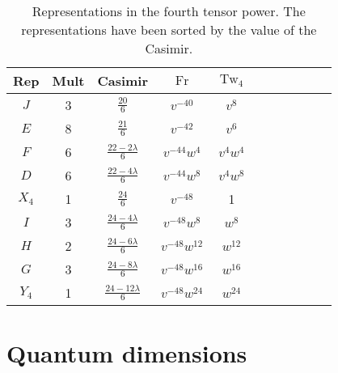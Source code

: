 \documentclass[12pt]{amsart}
\DeclareMathOperator{\Tw}{Tw}
\DeclareMathOperator{\Fr}{Fr}
\begin{document}
\begin{table}
  \centering
  \medskip
  \begin{tabular}{ccccccccccc}
    \toprule
    Rep & Mult & Casimir & $\Fr$ & $\Tw_4$ \\ \midrule
    $J$ & 3 & $\frac{20}{6}$ & $v^{-40}$ & $v^8$ \\[3pt]
    $E$ & 8 & $\frac{21}{6}$ & $v^{-42}$ & $v^6$ \\[3pt]
    $F$ & 6 & $\frac{22 - 2\lambda}{6}$ & $v^{-44}w^4$ & $v^4w^4$ \\[3pt]
    $D$ & 6 & $\frac{22 - 4\lambda}{6}$ & $v^{-44}w^8$ & $v^4w^8$ \\[3pt]
    $X_4$ & 1 & $\frac{24}{6}$ & $v^{-48}$ & 1\\[3pt]
    $I$ & 3 & $\frac{24 - 4\lambda}{6}$ & $v^{-48}w^8$ & $w^8$\\[3pt]
    $H$ & 2 & $\frac{24 - 6\lambda}{6}$ & $v^{-48}w^{12}$ & $w^{12}$\\[3pt]
    $G$ & 3 & $\frac{24 - 8\lambda}{6}$ & $v^{-48}w^{16}$ & $w^{16}$ \\[3pt]
    $Y_4$ & 1 & $\frac{24 - 12\lambda}{6}$ & $v^{-48}w^{24}$ & $w^{24}$ \\[3pt]
    \bottomrule
  \end{tabular}
  \medskip
  \caption{Representations in the fourth tensor power. The
    representations have been sorted by the value of the Casimir.}
  \label{tab:fourth-tensor}
\end{table}

\section{Quantum dimensions}
\label{sec:quantum-dimensions}
\end{document}
